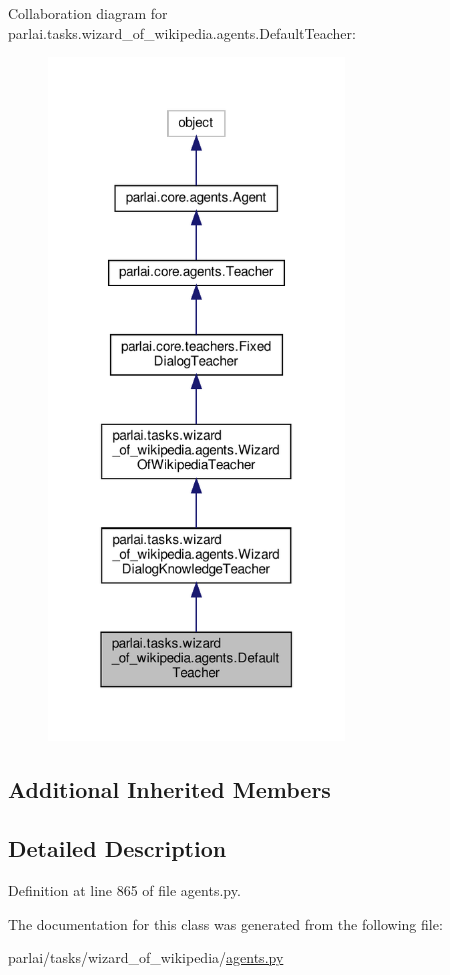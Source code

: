 Collaboration diagram for parlai.\+tasks.\+wizard\+\_\+of\+\_\+wikipedia.\+agents.\+Default\+Teacher\+:
\nopagebreak
\begin{figure}[H]
\begin{center}
\leavevmode
\includegraphics[width=223pt]{classparlai_1_1tasks_1_1wizard__of__wikipedia_1_1agents_1_1DefaultTeacher__coll__graph}
\end{center}
\end{figure}
\subsection*{Additional Inherited Members}


\subsection{Detailed Description}


Definition at line 865 of file agents.\+py.



The documentation for this class was generated from the following file\+:\begin{DoxyCompactItemize}
\item 
parlai/tasks/wizard\+\_\+of\+\_\+wikipedia/\hyperlink{parlai_2tasks_2wizard__of__wikipedia_2agents_8py}{agents.\+py}\end{DoxyCompactItemize}

